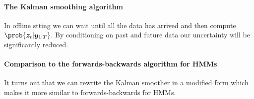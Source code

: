 \paragraph{The Kalman smoothing algorithm}
In offline stting we can wait until all the data has arrived and then compute $\prob{\bm{z}_{t}|
\bm{y}_{1:T}}$. By conditioning on past and future data our uncertainty will be significantly reduced.

\paragraph{Comparison to the forwards-backwards algorithm for HMMs}
It turns out that we can rewrite the Kalman smoother in a modified form which makes it more similar 
to forwards-backwards for HMMs.


